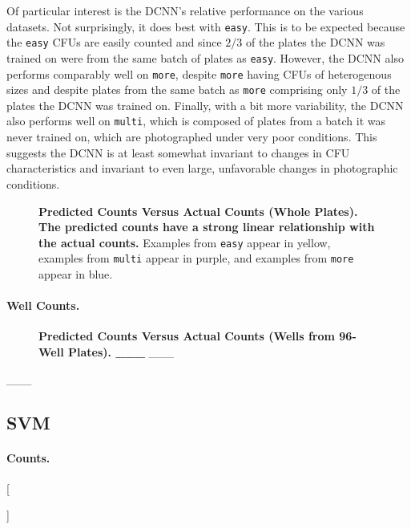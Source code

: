 \documentclass[10pt,letterpaper]{article}
\newcommand{\fillin}[1]{
    \IfEqCase{#1}{%
        {short}{\_}%
        {long}{\_\_\_\_\_}%
    }[\PackageError{fillin}{Undefined option to fillin: #1}{}]
}
\begin{document}
            Of particular interest is the DCNN's relative performance on the various datasets. Not surprisingly, it does best with \texttt{easy}. This is to be expected because the \texttt{easy} CFUs are easily counted and since $2/3$ of the plates the DCNN was trained on were from the same batch of plates as \texttt{easy}. However, the DCNN also performs comparably well on \texttt{more}, despite \texttt{more} having CFUs of heterogenous sizes and despite plates from the same batch as \texttt{more} comprising only $1/3$ of the plates the DCNN was trained on. Finally, with a bit more variability, the DCNN also performs well on \texttt{multi}, which is composed of plates from a batch it was never trained on, which are photographed under very poor conditions. This suggests the DCNN is at least somewhat invariant to changes in CFU characteristics and invariant to even large, unfavorable changes in photographic conditions.
            
            \begin{figure}[h]
                
                \caption{{\bf Predicted Counts Versus Actual Counts (Whole Plates). The predicted counts have a strong linear relationship with the actual counts.} Examples from \texttt{easy} appear in yellow, examples from \texttt{multi} appear in purple, and examples from \texttt{more} appear in blue.}
                \label{dcnn_plate_counts}
            \end{figure}

        \paragraph*{Well Counts.} 
            \begin{figure}[h]
                
                \caption{{\bf Predicted Counts Versus Actual Counts (Wells from 96-Well Plates). \_\_\_} \_\_\_}
                \label{dcnn_well_counts}
            \end{figure}
            
            \_\_\_
            
    \subsection*{SVM} \label{ssec:svm_results}
        \paragraph*{Counts.}
            \fillin{long}
                        
\end{document}
